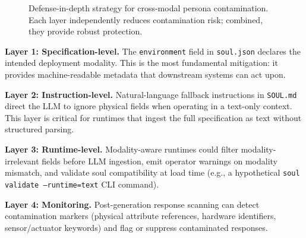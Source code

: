 \documentclass[manuscript,screen,nonacm]{acmart}
\begin{document}
\begin{figure}[t]
\centering
{}
\caption{Defense-in-depth strategy for cross-modal persona contamination. Each layer independently reduces contamination risk; combined, they provide robust protection.}
\label{fig:defense}
\end{figure}

\textbf{Layer 1: Specification-level.}
The \texttt{environment} field in \texttt{soul.json} declares the intended deployment modality.
This is the most fundamental mitigation: it provides machine-readable metadata that downstream systems can act upon.

\textbf{Layer 2: Instruction-level.}
Natural-language fallback instructions in \texttt{SOUL.md} direct the LLM to ignore physical fields when operating in a text-only context.
This layer is critical for runtimes that ingest the full specification as text without structured parsing.

\textbf{Layer 3: Runtime-level.}
Modality-aware runtimes could filter modality-irrelevant fields before LLM ingestion, emit operator warnings on modality mismatch, and validate soul compatibility at load time (e.g., a hypothetical \texttt{soul validate --runtime=text} CLI command).

\textbf{Layer 4: Monitoring.}
Post-generation response scanning can detect contamination markers (physical attribute references, hardware identifiers, sensor/actuator keywords) and flag or suppress contaminated responses.
\end{document}

